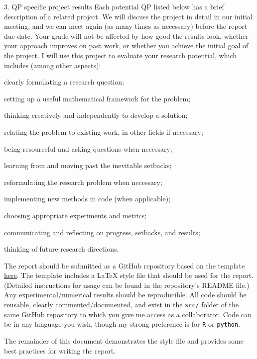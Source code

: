 \documentclass[12pt]{article}
\begin{document}
\item[3. QP specific project results] Each potential QP listed below has a brief
description of a related project. We will discuss the project in detail in our
initial meeting, and we can meet again (as many times as necessary) before the
report due date. Your grade will not be affected by how good the results look,
whether your approach improves on past work, or whether you achieve the initial
goal of the project. I will use this project to evaluate your research 
potential, which includes (among other aspects):
  \bitem
  \item clearly formulating a research question;
  \item setting up a useful mathematical framework for the problem;
  \item thinking creatively and independently to develop a solution;
  \item relating the problem to existing work, in other fields if necessary;
  \item being resourceful and asking questions when necessary;
  \item learning from and moving past the inevitable setbacks;
  \item reformulating the research problem when necessary;
  \item implementing new methods in code (when applicable);
  \item choosing appropriate experiments and metrics;
  \item communicating and reflecting on progress, setbacks, and results;
  \item thinking of future research directions.
  \eitem
\edesc



The report should be submitted as a GitHub repository based on the template
\href{https://github.com/dajmcdon/qp-template}{here}. The template includes a LaTeX
style file that should be used for the report. (Detailed instructions for usage
can be found in the repository's README file.) Any experimental/numerical
results should be reproducible. All code should be reusable, clearly
commented/documented, and exist in the \texttt{src/} folder of the same GitHub
repository to which you give me access as a collaborator. Code can be in any
language you wish, though my strong preference is for \texttt{R} or
\texttt{python}.


The remainder of this document demonstrates the style file and provides some
best practices for writing the report. 
\end{document}
